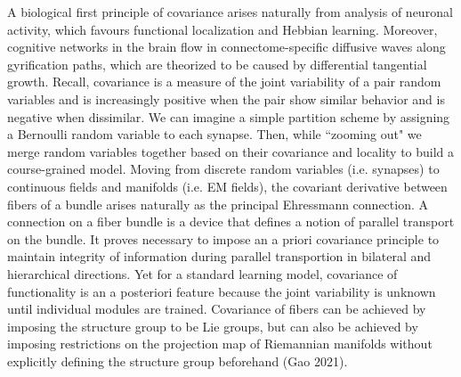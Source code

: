 \documentclass{article}
\begin{document}
   A biological first principle of covariance arises naturally from analysis of neuronal activity, which favours functional localization and Hebbian learning.
    Moreover, cognitive networks in the brain flow in connectome-specific diffusive waves along gyrification paths, which are theorized to be caused by differential tangential growth. 
    Recall, covariance is a measure of the joint variability of a pair random variables and is increasingly positive when the pair show similar behavior and is negative when dissimilar.
     We can imagine a simple partition scheme by  assigning a Bernoulli random variable to each synapse. Then, while ``zooming out" we merge random variables together based on their covariance and locality to build a course-grained model.
    Moving from discrete random variables (i.e. synapses) to continuous fields and manifolds (i.e. EM fields), the covariant derivative between fibers of a bundle arises naturally as the principal Ehressmann connection. 
    A connection on a fiber bundle is a device that defines a notion of parallel transport on the bundle.
    It proves necessary to impose an a priori covariance principle to maintain integrity of information during parallel transportion in bilateral and hierarchical directions.
    Yet for a standard learning model, covariance of functionality is an a posteriori feature because the joint variability is unknown until individual modules are trained. 
    Covariance of fibers can be achieved by imposing the structure group to be Lie groups, but can also be achieved by imposing restrictions on the projection map of Riemannian manifolds without explicitly defining the structure group beforehand (Gao 2021).


    
\end{document}
